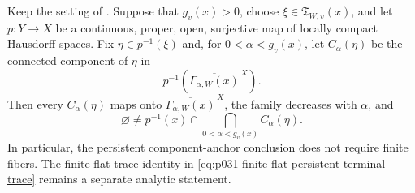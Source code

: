\begin{corollary}
\label{cor:p031-proper-open-persistent-terminal-anchor}
Keep the setting of
.  Suppose that
$g_v(x)>0$, choose $\xi\in\mathfrak T_{W,v}(x)$, and let
$p:Y\to X$ be a continuous, proper, open, surjective map of locally compact
Hausdorff spaces.  Fix $\eta\in p^{-1}(\xi)$ and, for
$0<\alpha<g_v(x)$, let $C_\alpha(\eta)$ be the connected component of
$\eta$ in
\[
       p^{-1}\!\left(
          \overline{\Gamma_{\alpha,W}(x)}^{\,X}
       \right).
\]
Then every $C_\alpha(\eta)$ maps onto
$\overline{\Gamma_{\alpha,W}(x)}^{\,X}$, the family decreases with
$\alpha$, and
\begin{equation}
\label{eq:p031-proper-open-persistent-terminal-anchor}
 \varnothing\ne
 p^{-1}(x)\cap
 \bigcap_{0<\alpha<g_v(x)}C_\alpha(\eta).
\end{equation}
In particular, the persistent component-anchor conclusion does not require
finite fibers.  The finite-flat trace identity in
\eqref{eq:p031-finite-flat-persistent-terminal-trace} remains a separate
analytic statement.
\end{corollary}
